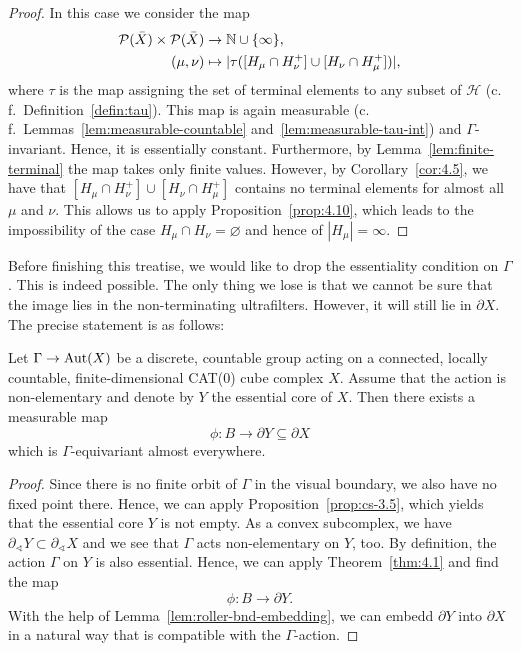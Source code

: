 \begin{proof}
  In this case we consider the map
  \begin{align*}
    \mathcal{P}(\bar X) \times \mathcal{P}(\bar X) &\to \mathbb{N} \cup \{\infty\},\\
    (\mu, \nu) &\mapsto |\tau([H_\mu \cap H_\nu^+] \cup [H_\nu \cap H_\mu^+])|,
  \end{align*}
  where \(\tau\) is the map assigning the set of terminal elements to any subset of \(\mathcal{H}\) (c.\,f.~Definition~\ref{defin:tau}). This map is again measurable (c.\,f.\ Lemmas~\ref{lem:measurable-countable} and~\ref{lem:measurable-tau-int}) and \(\Gamma\)-invariant. Hence, it is essentially constant. Furthermore, by Lemma~\ref{lem:finite-terminal} the map takes only finite values. However, by Corollary~\ref{cor:4.5}, we have that \([H_\mu \cap H_\nu^+] \cup [H_\nu \cap H_\mu^+]\) contains no terminal elements for almost all \(\mu\) and \(\nu\). This allows us to apply Proposition~\ref{prop:4.10}, which leads to the impossibility of the case \(H_\mu \cap H_\nu = \varnothing\) and hence of \(|H_\mu| = \infty\). 
\end{proof}

Before finishing this treatise, we would like to drop the essentiality condition on \(\Gamma\). This is indeed possible. The only thing we lose is that we cannot be sure that the image lies in the non-terminating ultrafilters. However, it will still lie in \(\partial X\). The precise statement is as follows:

\begin{cor}
  \label{cor:4.2}
  Let \(\Gamma \to \operatorname{Aut}(X)\) be a discrete, countable group acting on a connected, locally countable, finite-dimensional CAT(0) cube complex \(X\). Assume that the action is non-elementary and denote by \(Y\) the essential core of \(X\). Then there exists a measurable map
  \[
    \phi \colon B \to \partial Y \subseteq \partial X
  \]
  which is \(\Gamma\)-equivariant almost everywhere.
\end{cor}

\begin{proof}
  Since there is no finite orbit of \(\Gamma\) in the visual boundary, we also have no fixed point there. Hence, we can apply Proposition~\ref{prop:cs-3.5}, which yields that the essential core \(Y\) is not empty. As a convex subcomplex, we have \(\partial_\sphericalangle Y \subset \partial_\sphericalangle X\) and we see that \(\Gamma\) acts non-elementary on \(Y\), too. By definition, the action \(\Gamma\) on \(Y\) is also essential. Hence, we can apply Theorem~\ref{thm:4.1} and find the map
  \[
    \phi\colon B \to \partial Y.
  \]
  With the help of Lemma~\ref{lem:roller-bnd-embedding}, we can embedd \(\partial Y\) into \(\partial X\) in a natural way that is compatible with the \(\Gamma\)-action.
\end{proof}

